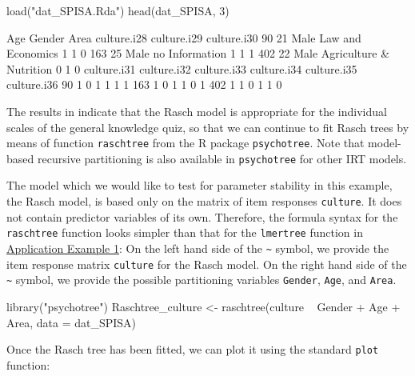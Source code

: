 \documentclass[doc,floatsintext,natbib]{apa7}
\begin{document}
\begin{Schunk}
\begin{Sinput}
 load("dat_SPISA.Rda")
 head(dat_SPISA, 3)
\end{Sinput}
\begin{Soutput}
    Age Gender                    Area culture.i28 culture.i29 culture.i30
90   21   Male       Law and Economics           1           1           0
163  25   Male          no Information           1           1           1
402  22   Male Agriculture & Nutrition           0           1           0
    culture.i31 culture.i32 culture.i33 culture.i34 culture.i35 culture.i36
90            1           0           1           1           1           1
163           1           0           1           1           0           1
402           1           1           0           1           1           0
\end{Soutput}
\end{Schunk}

The results in \citet{SPISA:book} indicate that the Rasch model is appropriate for the individual scales of the general knowledge quiz, so that we can continue to fit Rasch trees by means of function \texttt{raschtree} from the R package \texttt{psychotree}. Note that model-based recursive partitioning is also available in \texttt{psychotree} for other IRT models.

The model which we would like to test for parameter stability in this example, the Rasch model, is based only on the matrix of item responses \texttt{culture}. It does not contain predictor variables of its own. Therefore, the formula syntax for the \texttt{raschtree} function looks simpler than that for the \texttt{lmertree} function in \hyperref[sec:TutorialMixed]{Application Example 1}: On the left hand side of the \verb|~| symbol, we provide the item response matrix \texttt{culture} for the Rasch model. On the right hand side of the \verb|~| symbol, we provide the possible partitioning variables \texttt{Gender}, \texttt{Age}, and \texttt{Area}.



\begin{Schunk}
\begin{Sinput}
 library("psychotree")
 Raschtree_culture <- raschtree(culture ~  Gender + Age + Area,
                                data = dat_SPISA)
\end{Sinput}
\end{Schunk}

Once the Rasch tree has been fitted, we can plot it using the standard \texttt{plot} function: 
\end{document}
